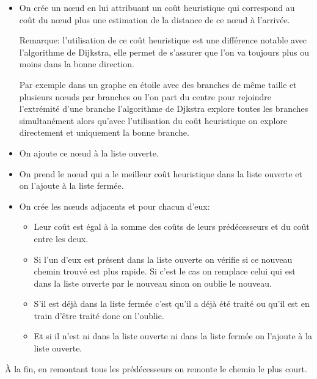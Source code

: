     \begin{itemize}
      \item On crée un nœud en lui attribuant un coût heuristique qui
        correspond au coût du nœud plus une estimation de la distance de ce
        nœud à l'arrivée.

        Remarque: l'utilisation de ce coût heuristique est une différence
        notable avec l'algorithme de Dijkstra, elle permet de s'assurer que
        l'on va toujours plus ou moins dans la bonne direction.

        Par exemple dans un graphe en étoile avec des branches de même taille
        et plusieurs nœuds par branches ou l'on part du centre pour rejoindre
        l'extrémité d'une branche l'algorithme de Djkstra explore toutes les
        branches simultanément alors qu'avec l'utilisation du coût heuristique
        on explore directement et uniquement la bonne branche.
      \item On ajoute ce nœud à la liste ouverte.
      \item On prend le nœud qui a le meilleur coût heuristique dans la liste
        ouverte et on l'ajoute à la liste fermée.
      \item On crée les nœuds adjacents et pour chacun d'eux:
        \begin{itemize}
          \item Leur coût est égal à la somme des coûts de leurs prédécesseurs
            et du coût entre les deux.
          \item Si l'un d'eux est présent dans la liste ouverte on vérifie si
            ce nouveau chemin trouvé est plus rapide. Si c'est le cas on
            remplace celui qui est dans la liste ouverte par le nouveau sinon
            on oublie le nouveau.
          \item S'il est déjà dans la liste fermée c'est qu'il a déjà été
            traité ou qu'il est en train d'être traité donc on l'oublie.
          \item Et si il n'est ni dans la liste ouverte ni dans la liste fermée
            on l'ajoute à la liste ouverte.
        \end{itemize}
    \end{itemize}
	
    À la fin, en remontant tous les prédécesseurs on remonte le chemin le plus
    court.
